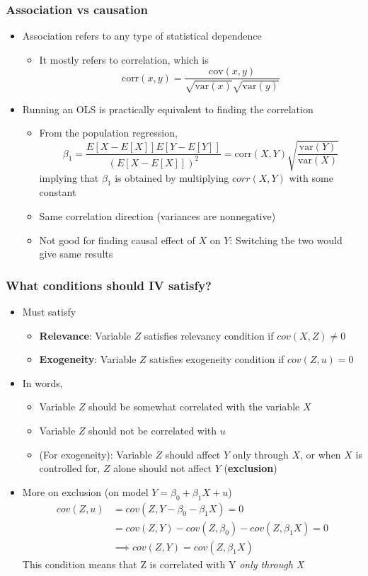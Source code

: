 \documentclass[aspectratio=169]{beamer}
\begin{document}
\begin{frame}
\frametitle{Association vs causation}
\begin{itemize}
\item Association refers to any type of statistical dependence
\begin{itemize}
\item It mostly refers to correlation, which is 
\[
\text{corr}(x,y) = \frac{\text{cov}(x,y)}{\sqrt{\text{var}(x)}\sqrt{\text{var}(y)}}
\]
\end{itemize}
\item Running an OLS is practically equivalent to finding the correlation
\begin{itemize}
\item From the population regression, 
\[
\beta_1=\frac{E[X-E[X]]E[Y-E[Y]]}{(E[X-E[X]])^2} = \text{corr}(X,Y)\sqrt{\frac{\text{var}(Y)}{\text{var}(X)}}
\]
implying that $\beta_1$ is obtained by multiplying $corr(X,Y)$ with some constant
\item Same correlation direction (variances are nonnegative)
\item Not good for finding causal effect of $X$ on $Y$: Switching the two would give same results
\end{itemize}
\end{itemize}
\end{frame}

\begin{frame}
\frametitle{What conditions should IV satisfy?}
\begin{itemize}
\item Must satisfy
\begin{itemize}
\item\textbf{Relevance}: Variable $Z$ satisfies relevancy condition if $cov(X,Z)\neq0$
\item\textbf{Exogeneity}: Variable $Z$ satisfies exogeneity condition if $cov(Z,u)=0$
\end{itemize}
\item In words, 
\begin{itemize}
\item Variable $Z$ should be somewhat correlated with the variable $X$
\item Variable $Z$ should not be correlated with $u$
\item (For exogeneity): Variable $Z$ should affect $Y$ only through $X$, or when $X$ is controlled for, $Z$ alone should not affect $Y$ (\textbf{exclusion})
\end{itemize}
\item More on exclusion (on model $Y=\beta_0+\beta_1X+u$)
\[
\begin{aligned}
cov(Z,u)&=cov(Z,Y-\beta_0-\beta_1X)=0\\
&=cov(Z,Y)-cov(Z,\beta_0)-cov(Z,\beta_1X)=0\\
&\implies cov(Z,Y)=cov(Z,\beta_1X)
\end{aligned}
\]
This condition means that Z is correlated with Y \textit{only through X}
\end{itemize}
\end{frame}
\end{document}
